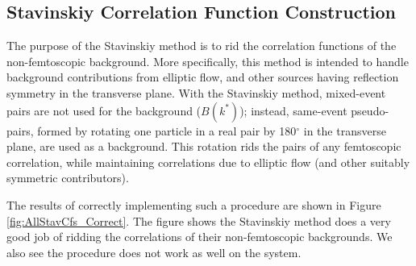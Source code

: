 \documentclass[/home/jesse/Analysis/FemtoAnalysis/AnalysisNotes/AnalysisNoteJBuxton.tex]{subfiles}
\begin{document}
\subsection{Stavinskiy Correlation Function Construction}
\label{StavCfConstruction}

The purpose of the Stavinskiy method is to rid the correlation functions of the non-femtoscopic background.  More specifically, this method is intended to handle background contributions from elliptic flow, and other sources having reflection symmetry in the transverse plane.  With the Stavinskiy method, mixed-event pairs are not used for the background ($B(k^{*})$); instead, same-event pseudo-pairs, formed by rotating one particle in a real pair by 180$^\circ$ in the transverse plane, are used as a background.  This rotation rids the pairs of any femtoscopic correlation, while maintaining correlations due to elliptic flow (and other suitably symmetric contributors).

The results of correctly implementing such a procedure are shown in Figure \ref{fig:AllStavCfs_Correct}.  The figure shows the Stavinskiy method does a very good job of ridding the \LamKpm correlations of their non-femtoscopic backgrounds.  We also see the procedure does not work as well on the \LamKs system.
\end{document}
